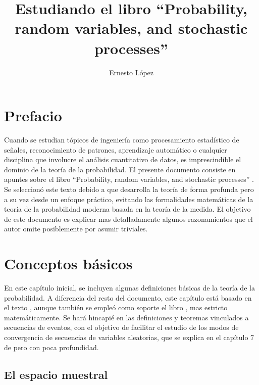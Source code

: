 \documentclass[a4paper]{report}
\title{Estudiando el libro ``Probability, random variables, and stochastic processes''}
\author{Ernesto López}
\begin{document}
 

\maketitle
{}
\tableofcontents


\chapter*{Prefacio}

Cuando se estudian tópicos de ingeniería como procesamiento estadístico de señales, reconocimiento de patrones, aprendizaje automático o cualquier disciplina que involucre el análisis cuantitativo de datos, es imprescindible el dominio de la teoría de la probabilidad.
El presente documento consiste en apuntes sobre el libro ``Probability, random variables, and stochastic processes'' \cite{papoulis2002probability}. Se seleccionó este texto debido a que desarrolla la teoría de forma profunda pero a su vez desde un enfoque práctico, evitando las formalidades matemáticas de la teoría de la probabilidad moderna basada en la teoría de la medida. El objetivo de este documento es explicar mas detalladamente algunos razonamientos que el autor omite posiblemente por asumir triviales. 


\chapter{Conceptos básicos}

En este capítulo inicial, se incluyen algunas definiciones básicas de la teoría de la probabilidad. A diferencia del resto del documento, este capítulo está basado en el texto \cite{kupferman09lectures}, aunque también se empleó como soporte el libro \cite{resnick1999probability}, mas estricto matemáticamente. Se hará hincapié en las definiciones y teoremas vinculados a secuencias de eventos, con el objetivo de facilitar el estudio de los modos de convergencia de secuencias de variables aleatorias, que se explica en el capítulo 7 de \cite{papoulis2002probability} pero con poca profundidad. 

\section{El espacio muestral}
\end{document}
